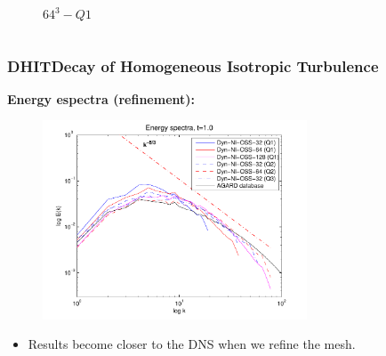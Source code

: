 \begin{frame}
\begin{columns}
\begin{column}{0.5\textwidth}
\begin{figure}
      \vspace*{-0.8cm}
  \caption{$64^3-Q1$}
  \end{figure}
  \end{column}
  \end{columns}
  \begin{overlayarea}{\textwidth}{1.5cm}
  \vspace*{-0.3cm}
  \end{overlayarea}
\end{frame}
\begin{frame}[t]
  \frametitle{DHIT{\small Decay of Homogeneous Isotropic Turbulence}}
  \textbf{Energy espectra (refinement):}
  \begin{figure}
    \centering	
    \includegraphics[width=0.7\textwidth]{Figures/spec_hp_1}
  \end{figure}
  \begin{overlayarea}{\textwidth}{1.5cm}
  \vspace*{-0.6cm}
  \begin{itemize}
  	\item Results become \alert<1->{closer to the DNS when we refine} the mesh.
  \end{itemize}
  \end{overlayarea}
\end{frame}